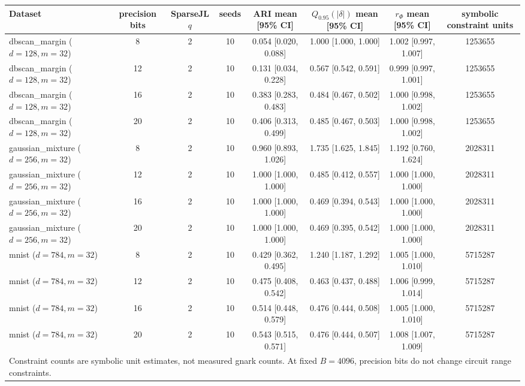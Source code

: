 \begin{tabular}{lccccccc}
\toprule
Dataset & precision bits & SparseJL $q$ & seeds & ARI mean [95\% CI] & $Q_{0.95}(|\delta|)$ mean [95\% CI] & $r_\Phi$ mean [95\% CI] & symbolic constraint units \\
\midrule
dbscan\_margin ($d=128,m=32$) & 8 & 2 & 10 & 0.054 [0.020, 0.088] & 1.000 [1.000, 1.000] & 1.002 [0.997, 1.007] & 1253655 \\
dbscan\_margin ($d=128,m=32$) & 12 & 2 & 10 & 0.131 [0.034, 0.228] & 0.567 [0.542, 0.591] & 0.999 [0.997, 1.001] & 1253655 \\
dbscan\_margin ($d=128,m=32$) & 16 & 2 & 10 & 0.383 [0.283, 0.483] & 0.484 [0.467, 0.502] & 1.000 [0.998, 1.002] & 1253655 \\
dbscan\_margin ($d=128,m=32$) & 20 & 2 & 10 & 0.406 [0.313, 0.499] & 0.485 [0.467, 0.503] & 1.000 [0.998, 1.002] & 1253655 \\
gaussian\_mixture ($d=256,m=32$) & 8 & 2 & 10 & 0.960 [0.893, 1.026] & 1.735 [1.625, 1.845] & 1.192 [0.760, 1.624] & 2028311 \\
gaussian\_mixture ($d=256,m=32$) & 12 & 2 & 10 & 1.000 [1.000, 1.000] & 0.485 [0.412, 0.557] & 1.000 [1.000, 1.000] & 2028311 \\
gaussian\_mixture ($d=256,m=32$) & 16 & 2 & 10 & 1.000 [1.000, 1.000] & 0.469 [0.394, 0.543] & 1.000 [1.000, 1.000] & 2028311 \\
gaussian\_mixture ($d=256,m=32$) & 20 & 2 & 10 & 1.000 [1.000, 1.000] & 0.469 [0.395, 0.542] & 1.000 [1.000, 1.000] & 2028311 \\
mnist ($d=784,m=32$) & 8 & 2 & 10 & 0.429 [0.362, 0.495] & 1.240 [1.187, 1.292] & 1.005 [1.000, 1.010] & 5715287 \\
mnist ($d=784,m=32$) & 12 & 2 & 10 & 0.475 [0.408, 0.542] & 0.463 [0.437, 0.488] & 1.006 [0.999, 1.014] & 5715287 \\
mnist ($d=784,m=32$) & 16 & 2 & 10 & 0.514 [0.448, 0.579] & 0.476 [0.444, 0.508] & 1.005 [1.000, 1.010] & 5715287 \\
mnist ($d=784,m=32$) & 20 & 2 & 10 & 0.543 [0.515, 0.571] & 0.476 [0.444, 0.507] & 1.008 [1.007, 1.009] & 5715287 \\
\midrule
\multicolumn{8}{l}{\footnotesize Constraint counts are symbolic unit estimates, not measured gnark counts. At fixed $B=4096$, precision bits do not change circuit range constraints.} \\
\bottomrule
\end{tabular}
